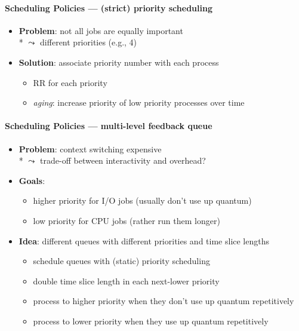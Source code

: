\paragraph{Scheduling Policies --- (strict) priority scheduling}
\begin{itemize}
  \item \textbf{Problem}: not all jobs are equally important \\*
    \( \leadsto \) different priorities (e.g., 4)
  \item \textbf{Solution}: associate priority number with each process
  \begin{itemize}
    \item RR for each priority
    \item \emph{aging}: increase priority of low priority processes over time
  \end{itemize}
\end{itemize}

\paragraph{Scheduling Policies --- multi-level feedback queue}
\begin{itemize}
  \item \textbf{Problem}: context switching expensive \\*
    \( \leadsto \) trade-off between interactivity and overhead?
  \item \textbf{Goals}:
  \begin{itemize}
    \item higher priority for I/O jobs (usually don't use up quantum)
    \item low priority for CPU jobs (rather run them longer)
  \end{itemize}
  \item \textbf{Idea}: different queues with different priorities and time slice lengths
  \begin{itemize}
    \item schedule queues with (static) priority scheduling
    \item double time slice length in each next-lower priority
    \item process to higher priority when they don't use up quantum repetitively
    \item process to lower priority when they use up quantum repetitively
  \end{itemize}
\end{itemize}

